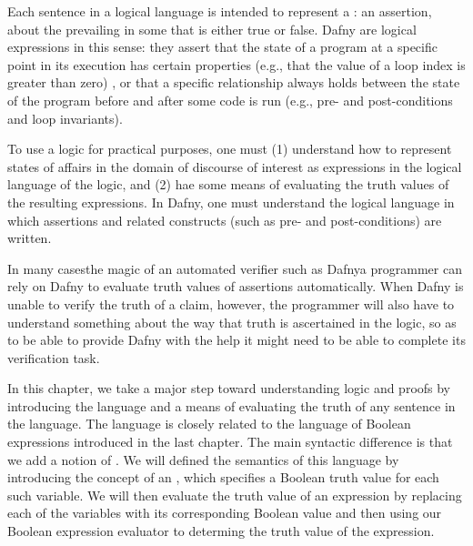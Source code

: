 \documentclass[letterpaper,10pt,english]{sphinxmanual}
\begin{document}
Each sentence in a logical language is intended to represent a : an assertion, about the prevailing  in some
 that is either true or false. Dafny 
are logical expressions in this sense: they assert that the state of a
program at a specific point in its execution has certain properties
(e.g., that the value of a loop index is greater than zero) , or that
a specific relationship always holds between the state of the program
before and after some code is run (e.g., pre- and post-conditions and
loop invariants).

To use a logic for practical purposes, one must (1) understand how to
represent states of affairs in the domain of discourse of interest as
expressions in the logical language of the logic, and (2) hae some
means of evaluating the truth values of the resulting expressions. In
Dafny, one must understand the logical language in which assertions
and related constructs (such as pre- and post-conditions) are written.

In many cases\textendash{}the magic of an automated verifier such as Dafny\textendash{}a
programmer can rely on Dafny to evaluate truth values of assertions
automatically. When Dafny is unable to verify the truth of a claim,
however, the programmer will also have to understand something about
the way that truth is ascertained in the logic, so as to be able to
provide Dafny with the help it might need to be able to complete its
verification task.

In this chapter, we take a major step toward understanding logic and
proofs by introducing the language  and a means
of evaluating the truth of any sentence in the language. The language
is closely related to the language of Boolean expressions introduced
in the last chapter. The main syntactic difference is that we add a
notion of . We will defined the semantics of
this language by introducing the concept of an , which
specifies a Boolean truth value for each such variable. We will then
evaluate the truth value of an expression  by replacing each of the
variables with its corresponding Boolean value and then using our
Boolean expression evaluator to determing the truth value of the
expression.
\end{document}
